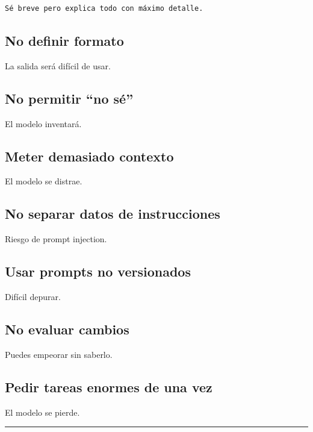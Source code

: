\begin{lstlisting}
Sé breve pero explica todo con máximo detalle.
\end{lstlisting}

\subsection{No definir formato}\label{no-definir-formato}

La salida será difícil de usar.

\subsection{No permitir ``no sé''}\label{no-permitir-no-suxe9}

El modelo inventará.

\subsection{Meter demasiado contexto}\label{meter-demasiado-contexto}

El modelo se distrae.

\subsection{No separar datos de
instrucciones}\label{no-separar-datos-de-instrucciones}

Riesgo de prompt injection.

\subsection{Usar prompts no
versionados}\label{usar-prompts-no-versionados}

Difícil depurar.

\subsection{No evaluar cambios}\label{no-evaluar-cambios}

Puedes empeorar sin saberlo.

\subsection{Pedir tareas enormes de una
vez}\label{pedir-tareas-enormes-de-una-vez}

El modelo se pierde.

\begin{center}\rule{0.5\linewidth}{0.5pt}\end{center}

